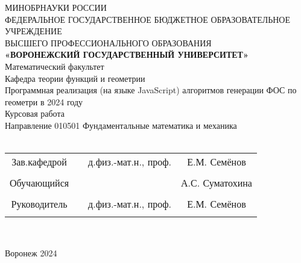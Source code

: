 
\begin{center}
	\hfill \break
	\large{МИНОБРНАУКИ РОССИИ}\\
	\footnotesize{ФЕДЕРАЛЬНОЕ ГОСУДАРСТВЕННОЕ БЮДЖЕТНОЕ ОБРАЗОВАТЕЛЬНОЕ УЧРЕЖДЕНИЕ}\\
	\footnotesize{ВЫСШЕГО ПРОФЕССИОНАЛЬНОГО ОБРАЗОВАНИЯ}\\
	\small{\textbf{«ВОРОНЕЖСКИЙ ГОСУДАРСТВЕННЫЙ УНИВЕРСИТЕТ»}}\\
	\hfill \break
	\normalsize{Математический факультет}\\
	\hfill \break
	\normalsize{Кафедра теории функций и геометрии}\\
	\hfill\break
	\hfill \break
	\hfill \break
	\hfill \break
	\large{Программная реализация (на языке JavaScript) алгоритмов генерации ФОС по геометри в 2024 году}\\
	\hfill \break
	\hfill \break
	\hfill \break
	\hfill \break
	\hfill \break
	\normalsize{Курсовая работа\\
		\hfill \break
		Направление  010501 Фундаментальные математика и механика\\

		\hfill \break
	}\\
	\hfill \break
	\hfill \break
\end{center}
\hfill \break

\normalsize{
	\begin{tabular}{cccc}
		Зав.кафедрой & \underline{\hspace{3cm}} & д.физ.-мат.н.,  проф. & Е.М. Семёнов    \\\\
		Обучающийся  & \underline{\hspace{3cm}} &                       & А.С. Суматохина \\\\
		Руководитель & \underline{\hspace{3cm}} & д.физ.-мат.н.,  проф. & Е.М. Семёнов    \\\\
	\end{tabular}
}\\
\hfill \break
\hfill \break
\begin{center} Воронеж 2024 \end{center}
\thispagestyle{empty} %

